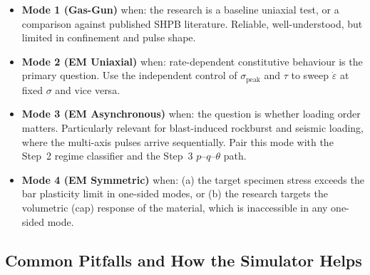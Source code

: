 \documentclass[11pt,a4paper]{article}
\newcommand{\sig}{\sigma}
\newcommand{\eps}{\varepsilon}
\newcommand{\epsdot}{\dot\eps}
\newcommand{\sigpeak}{\sig_{\text{peak}}}
\begin{document}
\begin{itemize}[leftmargin=*, itemsep=3pt]
  \item \textbf{Mode 1 (Gas-Gun)} when: the research is a baseline uniaxial
        test, or a comparison against published SHPB literature. Reliable,
        well-understood, but limited in confinement and pulse shape.

  \item \textbf{Mode 2 (EM Uniaxial)} when: rate-dependent constitutive
        behaviour is the primary question. Use the independent control of
        $\sigpeak$ and $\tau$ to sweep $\epsdot$ at fixed $\sig$ and vice
        versa.

  \item \textbf{Mode 3 (EM Asynchronous)} when: the question is whether
        loading order matters. Particularly relevant for blast-induced
        rockburst and seismic loading, where the multi-axis pulses arrive
        sequentially. Pair this mode with the Step~2 regime classifier and
        the Step~3 $p$--$q$--$\theta$ path.

  \item \textbf{Mode 4 (EM Symmetric)} when: (a) the target specimen stress
        exceeds the bar plasticity limit in one-sided modes, or (b) the
        research targets the volumetric (cap) response of the material, which
        is inaccessible in any one-sided mode.
\end{itemize}

\subsection{Common Pitfalls and How the Simulator Helps}
\end{document}
